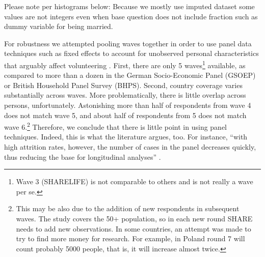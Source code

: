 \documentclass[10pt, letterpaper]{article}
\begin{document}
\begin{spacing}{1.4}
\begin{spacing}{.9}
\vspace{.2in}

Please note per histograms below: Because we mostly use imputed dataset some values are not integers even when base
question does not include fraction such as dummy variable for being married. 








For robustness we attempted pooling waves together in order to use panel data
techniques such as fixed effects to account for unobserved personal
characteristics that arguably affect volunteering \citep{meier08}. 
First, there are only 5 waves\footnote{Wave 3 (SHARELIFE) is not comparable to others and
is not really a wave per se.} available, as compared to more than a
dozen in the German Socio-Economic Panel (GSOEP) or British Household Panel
Survey (BHPS). Second, country coverage varies substantially across waves.
 More problematically, there is little overlap across persons, unfortunately.
Astonishing more than half of respondents from wave 4 does not match wave 5, and
about half of respondents from 5 does not match wave 6.\footnote{%
This may be also due
  to the addition of new respondents in subsequent waves. The study covers the 50+ population,
  so in each new round SHARE needs to add new observations. In some
  countries, an attempt was made to try to find more money for research. For
  example, in Poland round 7 will count probably 5000 people, that is, it will
  increase almost twice.}  Therefore, we conclude
that there is little point in using panel techniques.
%
Indeed, this is what the literature argues, too. For instance, ``with 
high attrition rates, however, the number of cases  in the panel decreases quickly, 
thus  reducing  the  base  for  longitudinal  analyses'' \citep{blom2011sample}. 


\end{spacing}
\end{spacing}
\end{document}
